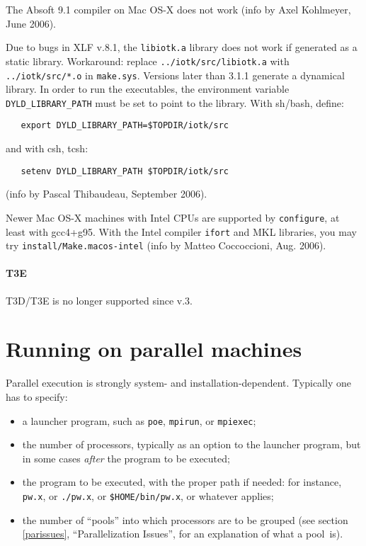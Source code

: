\documentclass[12pt,a4paper]{article}
\begin{document}
The Absoft 9.1 compiler on Mac OS-X does not work (info by Axel
Kohlmeyer, June 2006).

Due to bugs in XLF v.8.1, the \texttt{libiotk.a} library does not work 
if generated as a static library. Workaround: replace
\texttt{../iotk/src/libiotk.a} with \texttt{../iotk/src/*.o} in
\texttt{make.sys}. Versions later than 3.1.1 generate a dynamical 
library. In order to run the executables, the environment variable 
\texttt{DYLD\_LIBRARY\_PATH} must be set to point to the library. 
With sh/bash, define:
\begin{verbatim}
   export DYLD_LIBRARY_PATH=$TOPDIR/iotk/src
\end{verbatim}
and with csh, tcsh:
\begin{verbatim}
   setenv DYLD_LIBRARY_PATH $TOPDIR/iotk/src
\end{verbatim}
(info by Pascal Thibaudeau, September 2006).

Newer Mac OS-X machines with Intel CPUs  are supported by \texttt{configure},
at least with gcc4+g95. With the Intel compiler \texttt{ifort} and 
MKL libraries, you may try \texttt{install/Make.macos-intel} 
(info by Matteo Coccoccioni, Aug. 2006).

\paragraph{T3E}

T3D/T3E is no longer supported since v.3.

\clearpage

\section{Running on parallel machines}
  \label{runparallel}

Parallel execution is strongly system- and installation-dependent.
Typically one has to specify:

\begin{itemize}
  \item a launcher program, such as \texttt{poe}, \texttt{mpirun}, or
        \texttt{mpiexec};
  \item the number of processors, typically as an option to the
        launcher program, but in some cases \emph{after} the program
        to be executed;
  \item the program to be executed, with the proper path if needed:
        for instance, \texttt{pw.x}, or \texttt{./pw.x}, or
        \texttt{\$HOME/bin/pw.x}, or whatever applies;
  \item the number of ``pools'' into which processors are to be
        grouped (see section \ref{parissues}, ``Parallelization
        Issues'', for an explanation of what a pool~is).
\end{itemize}
\end{document}
